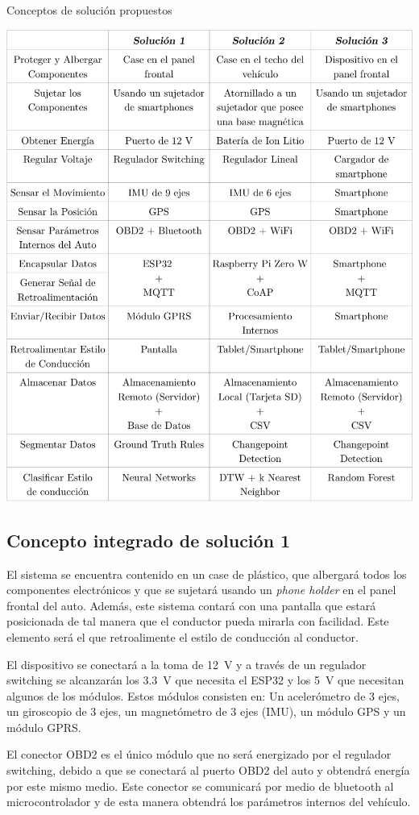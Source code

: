 \begin{table}[htbp!]
  \centering
  \caption{Conceptos de solución propuestos}
  \label{diag:resumen}
  \includegraphics[width=0.9\linewidth]{mat_resumen.pdf}
\end{table}
\newpage

\subsection{Concepto integrado de solución 1}
El sistema se encuentra contenido en un case de plástico, que albergará todos los componentes electrónicos y que se sujetará usando un {\it phone holder} en el panel frontal del auto. Además, este sistema contará con una pantalla que estará posicionada de tal manera que el conductor pueda mirarla con facilidad. Este elemento será el que retroalimente el estilo de conducción al conductor.

El dispositivo se conectará a la toma de \SI{12}{V} y a través de un regulador switching se alcanzarán los \SI{3.3}{V} que necesita el ESP32 y los \SI{5}{V} que necesitan algunos de los módulos.
Estos módulos consisten en: Un acelerómetro de 3 ejes, un giroscopio de 3 ejes, un magnetómetro de 3 ejes (IMU), un módulo GPS y un módulo GPRS.

El conector OBD2 es el único módulo que no será energizado por el regulador switching, debido a que se conectará al puerto OBD2 del auto y obtendrá energía por este mismo medio. Este conector se comunicará por medio de bluetooth al microcontrolador y de esta manera obtendrá los parámetros internos del vehículo.

